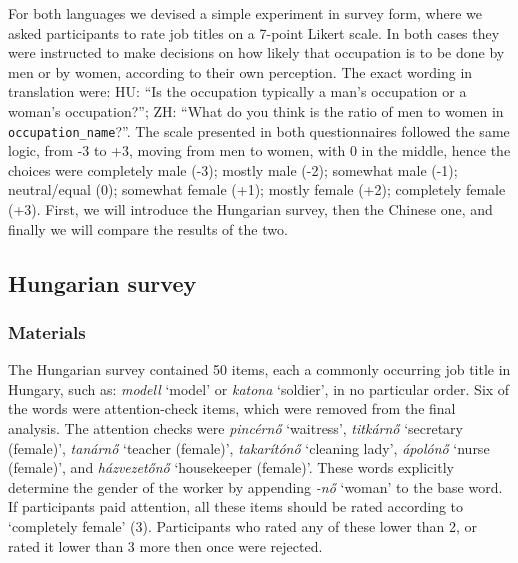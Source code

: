 \documentclass[11pt]{article}
\begin{document}
For both languages we devised a simple experiment in survey form, where we asked participants to rate job titles on a 7-point Likert scale. In both cases they were instructed to make decisions on how likely that occupation is to be done by men or by women, according to their own perception. The exact wording in translation were: HU: ``Is the occupation typically a man's occupation or a woman's occupation?''; ZH: ``What do you think is the ratio of men to women in \texttt{occupation\_name}?''. The scale presented in both questionnaires followed the same logic, from -3 to +3, moving from men to women, with 0 in the middle, hence the choices were completely male (-3); mostly male (-2); somewhat male (-1); neutral/equal (0); somewhat female (+1); mostly female (+2); completely female (+3). First, we will introduce the Hungarian survey, then the Chinese one, and finally we will compare the results of the two.

\subsection{Hungarian survey}


\subsubsection{Materials}

The Hungarian survey contained 50 items, each a commonly occurring job title in Hungary, such as: \textit{modell} `model' or \textit{katona} `soldier', in no particular order. Six of the words were attention-check items, which were removed from the final analysis. The attention checks were \textit{pincérnő} `waitress', \textit{titkárnő} `secretary (female)', \textit{tanárnő} `teacher (female)', \textit{takarítónő} `cleaning lady', \textit{ápolónő} `nurse (female)', and \textit{házvezetőnő} `housekeeper (female)'. These words explicitly determine the gender of the worker by appending \textit{-nő} `woman' to the base word. If participants paid attention, all these items should be rated according to `completely female' (3). Participants who rated any of these lower than 2, or rated it lower than 3 more then once were rejected. 
\end{document}
